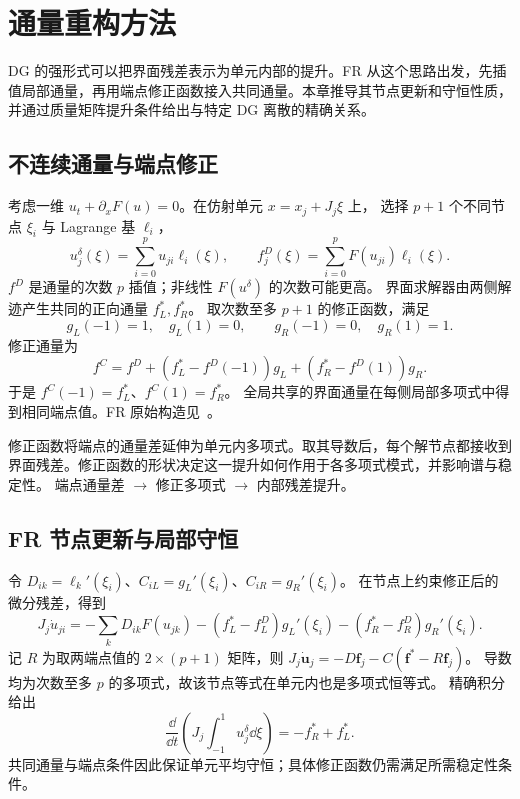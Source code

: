\chapter{通量重构方法}\label{ch:11}
\begin{chaptersummary}
DG 的强形式可以把界面残差表示为单元内部的提升。FR 从这个思路出发，先插值局部通量，再用端点修正函数接入共同通量。本章推导其节点更新和守恒性质，并通过质量矩阵提升条件给出与特定 DG 离散的精确关系。
\end{chaptersummary}

\section{不连续通量与端点修正}
考虑一维 $u_t+\partial_xF(u)=0$。在仿射单元 $x=x_j+J_j\xi$ 上，
选择 $p+1$ 个不同节点 $\xi_i$ 与 Lagrange 基 $\ell_i$，
\[
u_j^\delta(\xi)=\sum_{i=0}^pu_{ji}\ell_i(\xi),\qquad
f_j^D(\xi)=\sum_{i=0}^pF(u_{ji})\ell_i(\xi).
\]
$f^D$ 是通量的次数 $p$ 插值；非线性 $F(u^\delta)$ 的次数可能更高。
界面求解器由两侧解迹产生共同的正向通量 $f_L^*,f_R^*$。
取次数至多 $p+1$ 的修正函数，满足
\[
g_L(-1)=1,\quad g_L(1)=0,\qquad
g_R(-1)=0,\quad g_R(1)=1.
\]
修正通量为
\begin{equation}\label{eq:fr-flux}
f^C=f^D+(f_L^*-f^D(-1))g_L+(f_R^*-f^D(1))g_R.
\end{equation}
于是 $f^C(-1)=f_L^*$、$f^C(1)=f_R^*$。
全局共享的界面通量在每侧局部多项式中得到相同端点值。FR 原始构造见~\cite{huynh2007}。

{修正函数将端点的通量差延伸为单元内多项式。取其导数后，每个解节点都接收到界面残差。修正函数的形状决定这一提升如何作用于各多项式模式，并影响谱与稳定性。}
{端点通量差 $\longrightarrow$ 修正多项式 $\longrightarrow$ 内部残差提升。}

\section{FR 节点更新与局部守恒}
令 $D_{ik}=\ell_k'(\xi_i)$、$C_{iL}=g_L'(\xi_i)$、$C_{iR}=g_R'(\xi_i)$。
在节点上约束修正后的微分残差，得到
\begin{equation}\label{eq:fr-operator}
J_j\dot u_{ji}
=-\sum_kD_{ik}F(u_{jk})
-(f_L^*-f_L^D)g_L'(\xi_i)
-(f_R^*-f_R^D)g_R'(\xi_i).
\end{equation}
记 $R$ 为取两端点值的 $2\times(p+1)$ 矩阵，则
$J_j\dot{\bm u}_j=-D\bm f_j-C(\bm f^*-R\bm f_j)$。
导数均为次数至多 $p$ 的多项式，故该节点等式在单元内也是多项式恒等式。
精确积分给出
\[
\frac{\dd}{\dd t}\left(J_j\int_{-1}^1u_j^\delta\dd\xi\right)
=-f_R^*+f_L^*.
\]
共同通量与端点条件因此保证单元平均守恒；具体修正函数仍需满足所需稳定性条件。

